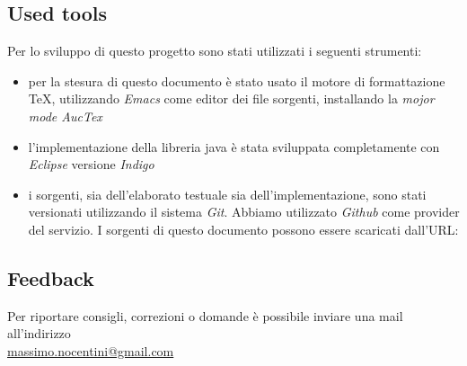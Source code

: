 \subsection{Used tools}
Per lo sviluppo di questo progetto sono stati utilizzati i seguenti
strumenti:
\begin{itemize}
\item per la stesura di questo documento \`e stato usato il motore di
  formattazione \TeX, utilizzando \emph{Emacs} come editor dei file
  sorgenti, installando la \emph{mojor mode AucTex}
\item l'implementazione della libreria java \`e stata sviluppata
  completamente con \emph{Eclipse} versione \emph{Indigo}
\item i sorgenti, sia dell'elaborato testuale sia
  dell'implementazione, sono stati versionati utilizzando il sistema
  \emph{Git}. Abbiamo utilizzato \emph{Github} come provider del
  servizio. I sorgenti di questo documento possono essere scaricati
  dall'URL:\\
\end{itemize}

\subsection{Feedback}
Per riportare consigli, correzioni o domande \`e possibile inviare una
mail all'indirizzo \\
\href{massimo.nocentini@gmail.com}{massimo.nocentini@gmail.com}
